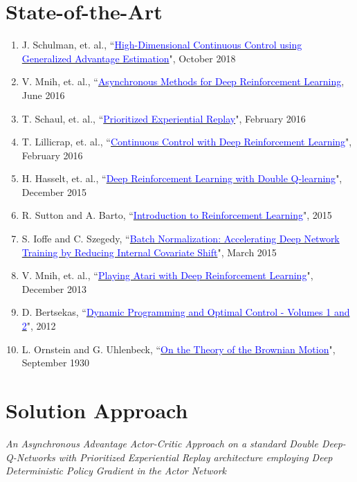 \documentclass{article}
\begin{document}
\section{State-of-the-Art}
\begin{enumerate}
    \item J. Schulman, et. al., ``\href{https://arxiv.org/pdf/1506.02438.pdf}{\textcolor{blue}{High-Dimensional Continuous Control using Generalized Advantage Estimation}}", October 2018\label{1}
    \item V. Mnih, et. al.,
    ``\href{https://arxiv.org/pdf/1602.01783.pdf}{\textcolor{blue}{Asynchronous Methods for Deep Reinforcement Learning}}, June 2016\label{2}
    \item T. Schaul, et. al., ``\href{https://arxiv.org/pdf/1511.05952.pdf}{\textcolor{blue}{Prioritized Experiential Replay}}", February 2016\label{3}
    \item T. Lillicrap, et. al., ``\href{https://arxiv.org/pdf/1509.02971.pdf}{\textcolor{blue}{Continuous Control with Deep Reinforcement Learning}}", February 2016\label{4}
    \item H. Hasselt, et. al.,
    ``\href{https://arxiv.org/pdf/1509.06461.pdf}{\textcolor{blue}{Deep Reinforcement Learning with Double Q-learning}}", December 2015\label{5}
    \item R. Sutton and A. Barto,
    ``\href{https://web.stanford.edu/class/psych209/Readings/SuttonBartoIPRLBook2ndEd.pdf}{\textcolor{blue}{Introduction to Reinforcement Learning}}", 2015\label{6}
    \item S. Ioffe and C. Szegedy,
    ``\href{https://arxiv.org/pdf/1502.03167.pdf}{\textcolor{blue}{Batch Normalization: Accelerating Deep Network Training by Reducing Internal Covariate Shift}}", March 2015\label{7}
    \item V. Mnih, et. al.,
    ``\href{https://arxiv.org/pdf/1312.5602.pdf}{\textcolor{blue}{Playing Atari with Deep Reinforcement Learning}}", December 2013\label{8}
    \item D. Bertsekas, ``\href{http://web.mit.edu/dimitrib/www/dpchapter.html}{\textcolor{blue}{Dynamic Programming and Optimal Control - Volumes 1 and 2}}", 2012\label{9}
    \item L. Ornstein and G. Uhlenbeck,
    ``\href{https://journals.aps.org/pr/abstract/10.1103/PhysRev.36.823}{\textcolor{blue}{On the Theory of the Brownian Motion}}", September 1930\label{10}
\end{enumerate}
\section{Solution Approach}
\textit{An Asynchronous Advantage Actor-Critic Approach on a standard Double Deep-Q-Networks with Prioritized Experiential Replay architecture employing Deep Deterministic Policy Gradient in the Actor Network}
\end{document}
